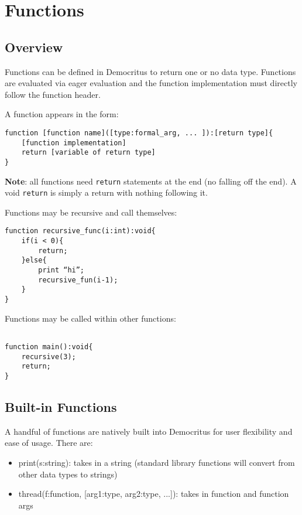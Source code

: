 \chapter{Functions}
    \section{Overview}
        Functions can be defined in Democritus to return one or no data type.  Functions are evaluated via eager evaluation and the function implementation must directly follow the function header.
        
        \vspace{5mm}
        \noindent A function appears in the form:
        
        \begin{lstlisting}
function [function name]([type:formal_arg, ... ]):[return type]{
    [function implementation]
    return [variable of return type]
}
        \end{lstlisting}

        \noindent \textbf{Note}: all functions need \texttt{return} statements at the end (no falling off the end). A void \texttt{return} is simply a return with nothing following it.

        \vspace{5mm}
        \noindent Functions may be recursive and call themselves:

        \begin{lstlisting}
function recursive_func(i:int):void{
    if(i < 0){
        return;
    }else{   
        print “hi”;
        recursive_fun(i-1);
    }
}
        \end{lstlisting}


        \noindent Functions may be called within other functions:
        \begin{lstlisting}

function main():void{
    recursive(3);
    return;
}
        \end{lstlisting}


    \section{Built-in Functions}
        A handful of functions are natively built into Democritus for user flexibility and ease of usage. There are:
        \begin{itemize}
            \item print(s:string): takes in a string (standard library functions will convert from other data types to strings)
            \item thread(f:function, [arg1:type, arg2:type, ...]): takes in function and function args
        \end{itemize}